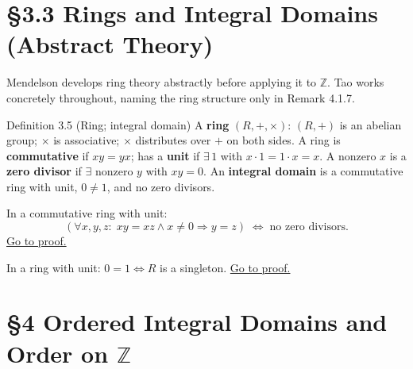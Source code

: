 \section*{\S{}3.3 \quad Rings and Integral Domains (Abstract Theory)}

\begin{remark*}
Mendelson develops ring theory abstractly before applying it to $\mathbb{Z}$.
Tao works concretely throughout, naming the ring structure only in
Remark 4.1.7.
\end{remark*}

\begin{corollarybox}{Definition 3.5 (Ring; integral domain)}
A \textbf{ring} $(R,+,\times)$: $(R,+)$ is an abelian group;
$\times$ is associative; $\times$ distributes over $+$ on both sides.
A ring is \textbf{commutative} if $xy=yx$;
has a \textbf{unit} if $\exists\,1$ with $x\cdot 1=1\cdot x=x$.
A nonzero $x$ is a \textbf{zero divisor} if $\exists$ nonzero $y$
with $xy=0$.
An \textbf{integral domain} is a commutative ring with unit,
$0 \neq 1$, and no zero divisors.
\end{corollarybox}

\begin{theorem}
\label{thm:men-cancel-equiv}
In a commutative ring with unit:
\[
(\forall x,y,z:\; xy=xz \wedge x\neq 0 \Rightarrow y=z)
\;\Longleftrightarrow\;
\text{no zero divisors.}
\]
\hyperref[prf:men-cancel-equiv]{Go to proof.}
\end{theorem}

\begin{theorem}
\label{thm:men-trivial}
In a ring with unit: $0=1 \Longleftrightarrow R$ is a singleton.
\hyperref[prf:men-trivial]{Go to proof.}
\end{theorem}

\section*{\texorpdfstring{\S{}4 \quad Ordered Integral Domains and Order on $\mathbb{Z}$}{S4 quad Ordered Integral Domains and Order on Z}}

